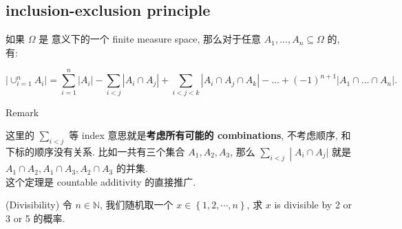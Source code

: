\subsection{inclusion-exclusion principle}\label{inclusion-exclusion-principle}

\begin{proposition}{}

如果 \(\Omega\) 是  意义下的一个 finite measure space, 那么对于任意 \(\mathit{A}_{1},\ldots,\mathit{A}_{\mathit{n}} \subseteq \Omega\) 的, 有:

\[\left| {\cup_{\mathit{i} = 1}^{\mathit{n}}\mathit{A}_{\mathit{i}}} \right| = \sum\limits_{\mathit{i} = 1}^{\mathit{n}}\left| \mathit{A}_{\mathit{i}} \right| - \sum\limits_{\mathit{i} < \mathit{j}}\left| {\mathit{A}_{\mathit{i}} \cap \mathit{A}_{\mathit{j}}} \right| + \sum\limits_{\mathit{i} < \mathit{j} < \mathit{k}}\left| {\mathit{A}_{\mathit{i}} \cap \mathit{A}_{\mathit{j}} \cap \mathit{A}_{\mathit{k}}} \right| - \ldots + ( - 1)^{\mathit{n} + 1}\left| {\mathit{A}_{1} \cap \ldots \cap \mathit{A}_{\mathit{n}}} \right|.\]

\end{proposition}

\begin{qlremark}{Remark}

这里的 \(\sum_{\mathit{i} < \mathit{j}}\) 等 index 意思就是\textbf{考虑所有可能的 combinations}, 不考虑顺序, 和下标的顺序没有关系. 比如一共有三个集合 \(\mathit{A}_{1},\mathit{A}_{2},\mathit{A}_{3}\), 那么 \(\left. \sum_{\mathit{i} < \mathit{j}} \middle| \mathit{A}_{\mathit{i}} \cap \mathit{A}_{\mathit{j}}| \right.\) 就是 \(\mathit{A}_{1} \cap \mathit{A}_{2},\mathit{A}_{1} \cap \mathit{A}_{3},\mathit{A}_{2} \cap \mathit{A}_{3}\) 的并集.\\
这个定理是 countable additivity 的直接推广.

\end{qlremark}

\begin{example}

(Divisibility) 令 \(\mathit{n} \in \mathbb{N}\), 我们随机取一个 \(\mathit{x} \in \left\{ {1,2,\cdots,\mathit{n}} \right\}\), 求 \(\mathit{x}\) is divisible by 2 or 3 or 5 的概率.

\end{example}


